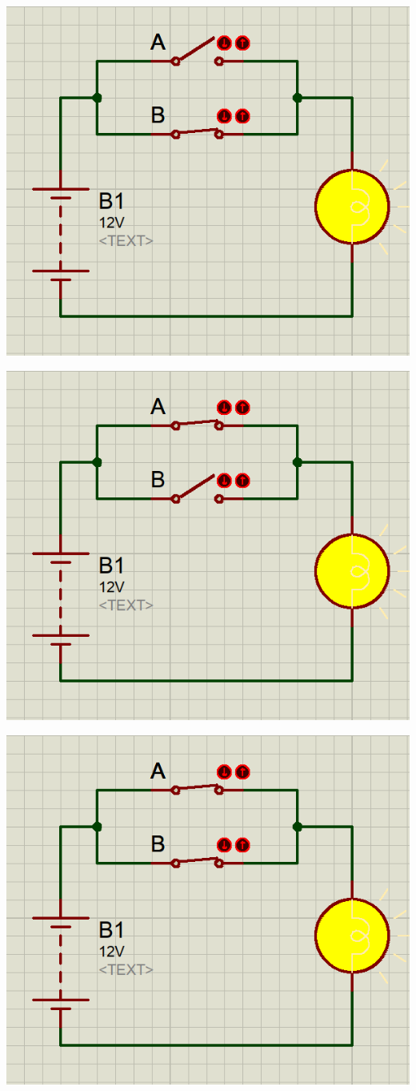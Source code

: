 \begin{multicols}{3}
\begin{center}
	\includegraphics[width=.8\linewidth]{./IMG/Screenshot_20231216_192323.png}
\end{center}

\vfill
\columnbreak
 
\begin{center}
	\includegraphics[width=.8\linewidth]{./IMG/Screenshot_20231216_192257.png}
\end{center}
    
\begin{center}
	\includegraphics[width=.8\linewidth]{./IMG/Screenshot_20231216_192355.png}
\end{center}


\end{multicols}
